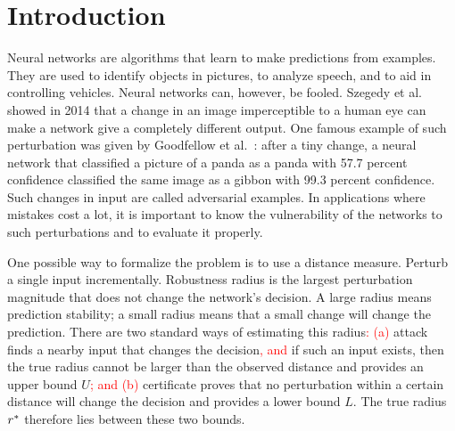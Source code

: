 \section{Introduction}
\label{sec:introduction}

Neural networks are algorithms that learn to make predictions from examples. They are used to
identify objects in pictures, to analyze speech, and to aid in controlling vehicles. Neural networks
can, however, be fooled. Szegedy et al.~\cite{MapSource01} showed in 2014 that a change in an image
imperceptible to a human eye can make a network give a completely different output. One famous
example of such perturbation was given by Goodfellow et al.~\cite[Fig.~1, p.~3]{MapSource02}: after
a tiny change, a neural network that classified a picture of a panda as a panda with 57.7 percent
confidence classified the same image as a gibbon with 99.3 percent confidence. Such changes in input
are called adversarial examples. In applications where mistakes cost a lot, it is important to know
the vulnerability of the networks to such perturbations and to evaluate it properly.

One possible way to formalize the problem is to use a distance measure. Perturb a single input
incrementally. Robustness radius is the largest perturbation magnitude that does not change the
network's decision. A large radius means prediction stability; a small radius means that a small
change will change the prediction. There are two standard ways of estimating this
radius\textcolor{red}{: (a)} attack finds a nearby input that changes the decision\textcolor{red}{, and}
if such an input exists, then the true radius cannot be larger than the observed distance and
provides an upper bound $U$\textcolor{red}{; and (b)} certificate
proves that no perturbation within a certain distance will change the decision and provides a lower
bound $L$. The true radius $r^{*}$ therefore lies between these two bounds.

